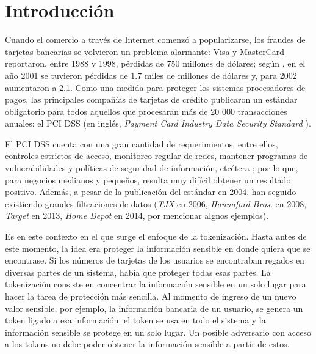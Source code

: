 %
%

\section{Introducción}


Cuando el comercio a través de Internet comenzó a popularizarse, los fraudes de
tarjetas bancarias se volvieron un problema alarmante: Visa y MasterCard
reportaron, entre 1988 y 1998, pérdidas de 750 millones de dólares; según
\cite{wallethub}, en el año 2001 se tuvieron pérdidas de 1.7 miles de millones
de dólares y, para 2002 aumentaron a 2.1. Como una medida para proteger los
sistemas procesadores de pagos, las principales compañías de tarjetas de crédito
publicaron un estándar obligatorio para todos aquellos que procesaran más de 20
000 transacciones anuales: el PCI DSS (en inglés, \textit{Payment Card Industry
Data Security Standard} \cite{pci_dss}).

El PCI DSS cuenta con una gran cantidad de requerimientos, entre ellos,
controles estrictos de acceso, monitoreo regular de redes, mantener programas de
vulnerabilidades y políticas de seguridad de información, etcétera
\cite{uk_association} \cite{search_security}; por lo que, para negocios
medianos y pequeños, resulta muy difícil obtener un resultado positivo. Además,
a pesar de la publicación del estándar en 2004, han seguido existiendo grandes
filtraciones de datos (\textit{TJX} en 2006, \textit{Hannaford Bros.} en 2008,
\textit{Target} en 2013, \textit{Home Depot} en 2014, por mencionar algnos
ejemplos).


Es en este contexto en el que surge el enfoque de la tokenización. Hasta antes
de este momento, la idea era proteger la información sensible en donde quiera
que se encontrase. Si los números de tarjetas de los usuarios se encontraban
regados en diversas partes de un sistema, había que proteger todas esas partes.
La tokenización consiste en concentrar la información sensible en un solo lugar
para hacer la tarea de protección más sencilla. Al momento de ingreso de un
nuevo valor sensible, por ejemplo, la información bancaria de un usuario, se
genera un token ligado a esa información: el token se usa en todo el sistema y
la información sensible se protege en un solo lugar. Un posible adversario con
acceso a los tokens no debe poder obtener la información sensible a partir de
estos.

